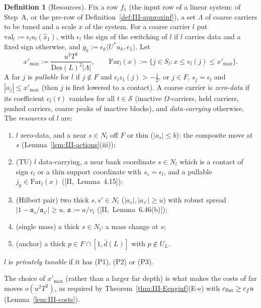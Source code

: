 \documentclass[10pt]{amsart}
\theoremstyle{definition}
\newtheorem{definition}[theorem]{Definition}
\theoremstyle{remark}
\newcommand{\ip}[2]{\langle #1,#2\rangle}
\begin{document}
\begin{definition}[Resources]\label{def:III-resources}
Fix a row $f_1$ (the input row of a linear system: of Step~A, or the
pre-row of Definition~\ref{def:III-approxinf}), a set $\Lambda$ of coarse
carriers to be tuned and a scale $x$ of the system.  For a coarse carrier
$l$ put $\mathrm{val}_l:=\epsilon_lu_l(\hat x_1)$, with $\epsilon_l$ the sign of
the switching of $l$ if $l$ carries data and a fixed sign otherwise, and
$g_k:=\epsilon_k\ip{U^*u_k}{e_1}$.  Let
\[
 x'_{\max}:=\frac{u^2T^3}{\mathrm{Des}(L)^2|\Lambda|},\qquad
 \mathrm{Far}_l(x):=\{j\in S_l:x\le v_l(j)\le x'_{\max}\} .
\]
A far $j$ is \emph{pullable} for $l$ if $j\notin F$ and $\epsilon_lz_1(j)>-\frac12$,
or $j\in F$, $s_j=\epsilon_l$ and $|a_j|\le x'_{\max}$ (then $j$ is first lowered
to a contact).  A coarse carrier is \emph{zero-data} if its coefficient $c_l(t)$
vanishes for all $t\in\mathcal S$ (inactive $\Omega$-carriers, held carriers,
pushed carriers, coarse peaks of inactive blocks), and \emph{data-carrying}
otherwise.  The \emph{resources} of $l$ are:
\begin{enumerate}
\item[(P1)] $l$ zero-data, and a near $s\in N_l$ off $F$ or thin
($|a_s|\le b$): the composite move at $s$ (Lemma~\ref{lem:III-actions}(iii));
\item[(P2)] (TU) $l$ data-carrying, a near bank coordinate $s\in N_l$ which is a
contact of sign $\epsilon_l$ or a thin support coordinate with $s_s=
\epsilon_l$, and a pullable $j_p\in\mathrm{Far}_l(x)$ ([II,~Lemma~4.15]);
\item[(P3)] (Hilbert pair) two thick $s,s'\in N_l$ ($|a_s|,|a_{s'}|\ge u$) with
robust spread $|1-\mathfrak a_s/\mathfrak a_{s'}|\ge u$, $\mathfrak a:=a/v_l$
([II,~Lemma~6.46(b)]);
\item[(P4)] (single mass) a thick $s\in N_l$: a mass change at $s$;
\item[(P5)] (anchor) a thick $p\in F\cap[1,\bar d(L)]$ with $p\notin U_L$.
\end{enumerate}
$l$ is \emph{privately tunable} if it has (P1), (P2) or (P3).
\end{definition}

The choice of $x'_{\max}$ (rather than a larger far depth) is what makes the
costs of far moves $o(u^2T^2)$, as required by
Theorem~\ref{thm:III-Eenginf}(E-e) with $c_{\rm flat}\ge c_fu$
(Lemma~\ref{lem:III-costs}).
\end{document}
